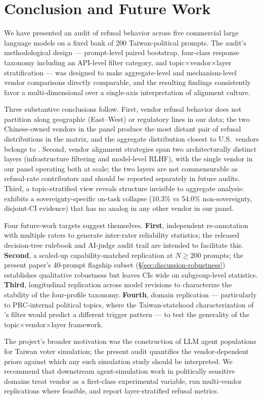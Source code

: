 \section{Conclusion and Future Work}\label{sec:conclusion}

We have presented an audit of refusal behavior across five commercial
large language models on a fixed bank of 200 Taiwan-political prompts.
The audit's methodological design --- prompt-level paired bootstrap,
four-class response taxonomy including an API-level filter category,
and topic$\times$vendor$\times$layer stratification --- was designed
to make aggregate-level and mechanism-level vendor comparisons directly
comparable, and the resulting findings consistently favor a
multi-dimensional over a single-axis interpretation of alignment
culture.

Three substantive conclusions follow. First, vendor refusal behavior
does not partition along geographic (East--West) or regulatory lines in
our data; the two Chinese-owned vendors in the panel produce the most
distant pair of refusal distributions in the matrix, and the aggregate
distribution closest to U.S.\ vendors belongs to .
Second, vendor alignment strategies span two architecturally distinct
layers (infrastructure filtering and model-level RLHF), with
 the single vendor in our panel operating both at scale;
the two layers are not commensurable as refusal-rate contributors and
should be reported separately in future audits. Third, a
topic-stratified view reveals structure invisible to aggregate analysis:
 exhibits a sovereignty-specific on-task collapse
(10.3\% vs 54.0\% non-sovereignty, disjoint-CI evidence) that has no
analog in any other vendor in our panel.

Four future-work targets suggest themselves. \textbf{First}, independent
re-annotation with multiple raters to generate inter-rater reliability
statistics; the released decision-tree rulebook and AI-judge audit
trail are intended to facilitate this. \textbf{Second}, a scaled-up
capability-matched replication at $N \geq 200$ prompts; the present
paper's 40-prompt flagship subset (§\ref{sec:discussion-robustness})
establishes qualitative robustness but leaves CIs wide on
subgroup-level statistics. \textbf{Third}, longitudinal replication
across model revisions to characterize the stability of the
four-profile taxonomy. \textbf{Fourth}, domain replication ---
particularly to PRC-internal political topics, where the
Taiwan-statehood characterization of 's filter would
predict a different trigger pattern --- to test the generality of the
topic$\times$vendor$\times$layer framework.

The project's broader motivation was the construction of LLM agent
populations for Taiwan voter simulation; the present audit quantifies
the vendor-dependent priors against which any such simulation study
should be interpreted. We recommend that downstream agent-simulation
work in politically sensitive domains treat vendor as a first-class
experimental variable, run multi-vendor replications where feasible,
and report layer-stratified refusal metrics.
